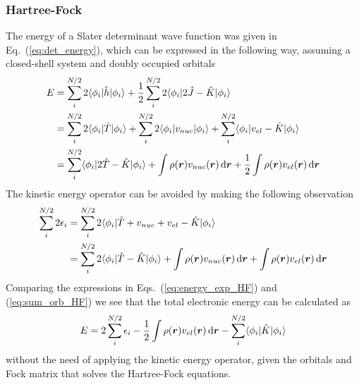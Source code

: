 \subsubsection{Hartree-Fock}
The energy of a Slater determinant wave function was given in Eq.~(\ref{eq:det_energy}), 
which can be expressed in the following way, assuming a closed-shell system and doubly
occupied orbitals
\begin{align}
    E	&= \sum_i^{N/2} 2\langle \phi_i|\hat{h}|\phi_i \rangle
	    + \frac{1}{2} \sum_i^{N/2} 2\langle \phi_i|2\hat{J} - \hat{K}|\phi_i \rangle\\
	&= \sum_i^{N/2} 2\langle \phi_i|\hat{T}|\phi_i \rangle
	    + \sum_i^{N/2} 2\langle \phi_i|v_{nuc}|\phi_i \rangle
	    + \sum_i^{N/2} \langle \phi_i|v_{el} - \hat{K}|\phi_i \rangle \\
    \label{eq:energy_exp_HF}
	&= \sum_i^{N/2} \langle \phi_i|2\hat{T} - \hat{K}|\phi_i \rangle
	    + \int \rho(\boldsymbol r)v_{nuc}(\boldsymbol r) \,\mathrm{d}\boldsymbol r
	    + \frac{1}{2} \int \rho(\boldsymbol r)v_{el}(\boldsymbol r) \,\mathrm{d}\boldsymbol r
\end{align}
The kinetic energy operator can be avoided by making the following observation
\begin{align}
    \sum_i^{N/2} 2 \epsilon_i 
	&= \sum_i^{N/2} 2\langle\phi_i|\hat{T}+v_{nuc}+v_{el}-\hat{K}|\phi_i\rangle\\
    \label{eq:sum_orb_HF}
	&= \sum_i^{N/2} 2\langle\phi_i|\hat{T} - \hat{K}|\phi_i\rangle
	    + \int \rho(\boldsymbol r)v_{nuc}(\boldsymbol r) \,\mathrm{d}\boldsymbol r
	    + \int \rho(\boldsymbol r)v_{el}(\boldsymbol r) \,\mathrm{d}\boldsymbol r
\end{align}
Comparing the expressions in Eqs.~(\ref{eq:energy_exp_HF}) and (\ref{eq:sum_orb_HF}) we see that
the total electronic energy can be calculated as
\begin{equation}
    E = 2 \sum_i^{N/2} \epsilon_i - \frac{1}{2} \int \rho(\boldsymbol r)v_{el}(\boldsymbol r) \,\mathrm{d}\boldsymbol r
	- \sum_i^{N/2} \langle\phi_i|\hat{K}|\phi_i\rangle
\end{equation}
without the need of applying the kinetic energy operator, given the orbitals and Fock matrix that
solves the Hartree-Fock equations.

